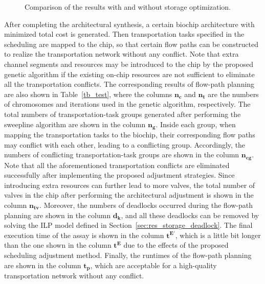 \begin{figure}[t]
{\figurefontsize
\centering

\caption{Comparison of the results with and without storage optimization.}
\label{fig:ideal_cmp}
}
\end{figure}

After completing the architectural synthesis, a certain biochip architecture with minimized total cost is generated. Then transportation tasks specified in the scheduling are mapped to the chip, so that certain flow paths can be constructed to realize the transportation network without any conflict. Note that extra channel segments and resources may be introduced to the chip by the proposed genetic algorithm if the existing on-chip resources are not sufficient to eliminate all the transportation conflicts. The corresponding results of flow-path planning are also shown in Table~\ref{tb_test}, where the columns $\boldsymbol{n_c}$ and $\boldsymbol{n_t}$ are the numbers of chromosomes and iterations used in the genetic algorithm, respectively. The total numbers of transportation-task groups generated after performing the sweepline algorithm are shown in the column $\boldsymbol{n_g}$. Inside each group, when mapping the transportation tasks to the biochip, their corresponding flow paths may conflict with each other, leading to a conflicting group. Accordingly, the numbers of conflicting transportation-task groups are shown in the column $\boldsymbol{n_{cg}}$. Note that all the aforementioned transportation conflicts are eliminated successfully after implementing the proposed adjustment strategies. Since introducing extra resources can further lead to more valves, the total number of valves in the chip after performing the architectural adjustment is shown in the column $\boldsymbol{n_{tv}}$. Moreover, the numbers of deadlocks occurred during the flow-path planning are shown in the column $\boldsymbol{d_{k}}$, and all these deadlocks can be removed by solving the ILP model defined in Section~\ref{sec:res_storage_deadlock}. The final execution time of the assay is shown in the column $\boldsymbol{t^{E'}}$, which is a little bit longer than the one shown in the column $\boldsymbol{t^{E}}$ due to the effects of the proposed scheduling adjustment method. Finally, the runtimes of the flow-path planning are shown in the column $\boldsymbol{t_p}$, which are acceptable for a high-quality transportation network without any conflict.


